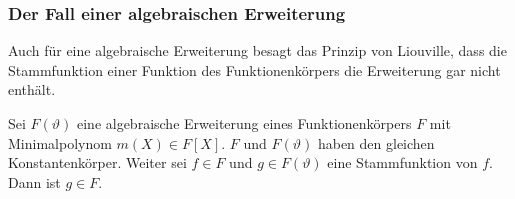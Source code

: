 %
%
\subsubsection{Der Fall einer algebraischen Erweiterung}
Auch für eine algebraische Erweiterung besagt das Prinzip von Liouville,
dass die Stammfunktion einer Funktion des Funktionenkörpers die
Erweiterung gar nicht enthält.

\begin{satz}
\label{buch:intalg:liouville:satz:algsimple}
Sei $F(\vartheta)$ eine algebraische Erweiterung eines
Funktionenkörpers $F$ mit Minimalpolynom $m(X)\in F[X]$.
$F$ und $F(\vartheta)$ haben den gleichen Konstantenkörper.
Weiter sei $f\in F$ und $g\in F(\vartheta)$ eine Stammfunktion von $f$.
Dann ist $g\in F$.
\end{satz}

